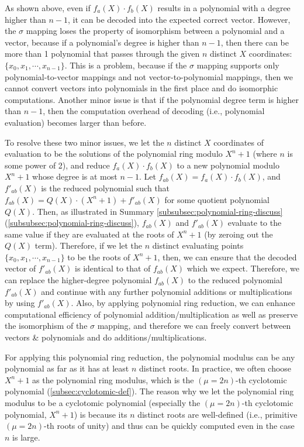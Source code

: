 As shown above, even if $f_a(X) \cdot f_b(X)$ results in a polynomial with a degree higher than $n-1$, it can be decoded into the expected correct vector. However, the $\sigma$ mapping loses the property of isomorphism between a polynomial and a vector, because if a polynomial's degree is higher than $n-1$, then there can be more than 1 polynomial that passes through the given $n$ distinct $X$ coordinates: $\{x_0, x_1, \cdots, x_{n-1}\}$. This is a problem, because if the $\sigma$ mapping supports only polynomial-to-vector mappings and not vector-to-polynomial mappings, then we cannot convert vectors into polynomials in the first place and do isomorphic computations. Another minor issue is that if the polynomial degree term is higher than $n-1$, then the computation overhead of decoding (i.e., polynomial evaluation) becomes larger than before. 

To resolve these two minor issues, we let the $n$ distinct $X$ coordinates of evaluation to be the solutions of the polynomial ring modulo $X^n + 1$ (where $n$ is some power of 2), and reduce $f_a(X) \cdot f_b(X)$ to a new polynomial modulo $X^n + 1$ whose degree is at most $n - 1$. Let $f_{ab}(X) = f_a(X) \cdot f_b(X)$, and $f'_{ab}(X)$ is the reduced polynomial such that $f_{ab}(X) = Q(X)\cdot (X^n + 1) + f'_{ab}(X)$ for some quotient polynomial $Q(X)$. Then, as illustrated in Summary \ref*{subsubsec:polynomial-ring-discuss} (\autoref{subsubsec:polynomial-ring-discuss}), $f_{ab}(X)$ and $f'_{ab}(X)$ evaluate to the same value if they are evaluated at the roots of $X^n + 1$ (by zeroing out the $Q(X)$ term). Therefore, if we let the $n$ distinct evaluating points $\{x_0, x_1, \cdots, x_{n-1}\}$ to be the roots of $X^n + 1$, then, we can ensure that the decoded vector of $f'_{ab}(X)$ is identical to that of $f_{ab}(X)$ which we expect. Therefore, we can replace the higher-degree polynomial $f_{ab}(X)$ to the reduced polynomial $f'_{ab}(X)$ and continue with any further polynomial additions or multiplications by using $f'_{ab}(X)$. Also, by applying polynomial ring reduction, we can enhance computational efficiency of polynomial addition/multiplication as well as preserve the isomorphism of the $\sigma$ mapping, and therefore we can freely convert between vectors \& polynomials and do additions/multiplications. 

For applying this polynomial ring reduction, the polynomial modulus can be any polynomial as far as it has at least $n$ distinct roots. In practice, we often choose $X^n + 1$ as the polynomial ring modulus, which is the $(\mu=2n)$-th cyclotomic polynomial (\autoref{subsec:cyclotomic-def}). The reason why we let the polynomial ring modulus to be a cyclotomic polynomial (especially the $(\mu=2n)$-th cyclotomic polynomial, $X^n + 1$) is because its $n$ distinct roots are well-defined (i.e., primitive $(\mu=2n)$-th roots of unity) and thus can be quickly computed even in the case $n$ is large.


